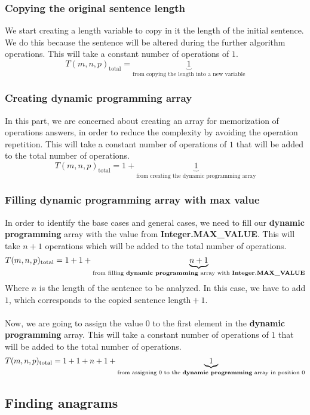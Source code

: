 \documentclass{article}
\begin{document}
	\subsubsection{Copying the original sentence length}
	We start creating a length variable to copy in it the length
	of the initial sentence. We do this because the sentence will
	be altered during the further algorithm operations. This will
	take a constant number of operations of $1$.
	\[
	T(m, n, p)_\text{total} = \underbrace{1}_\text{from copying the length into a new variable}
	\]
	\subsubsection{Creating dynamic programming array}
	In this part, we are concerned about creating an array for
	memorization of operations answers, in order to reduce the
	complexity by avoiding the operation repetition. This will
	take a constant number of operations of $1$ that will be
	added to the total number of operations.
	\[
	T(m, n, p)_\text{total} = 1 +	\underbrace{1}_\text{from creating the dynamic programming array}
	\]
	\subsubsection{Filling dynamic programming array with max value}
	In order to identify the base cases and general cases, we need
	to fill our \textbf{dynamic programming} array with the value
	from \textbf{Integer.MAX\_VALUE}. This will take $n + 1$ operations
	which will be added to the total number of operations.
	\[
	T(m, n, p)_\text{total} = 1 + 1 + \underbrace{n + 1}_\text{from filling \textbf{dynamic programming} array with \textbf{Integer.MAX\_VALUE}}
	\]
	Where $n$ is the length of the sentence to be analyzed. In this case, we have
	to add $1$, which corresponds to the $\text{copied sentence length} + 1$.
	\\
	\\
	Now, we are going to assign the value $0$ to the first element
	in the \textbf{dynamic programming} array. This will take a
	constant number of operations of $1$ that will be added to the
	total number of operations.
	\[
	T(m, n, p)_\text{total} = 1 + 1 + n + 1 + \underbrace{1}_\text{from assigning 0 to the \textbf{dynamic programming} array in position 0}
	\]
	\subsection{Finding anagrams}
\end{document}
